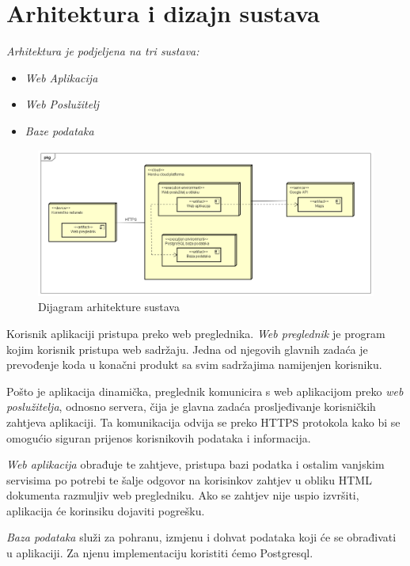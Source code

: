 \chapter{Arhitektura i dizajn sustava}

		\textit{Arhitektura je podjeljena na tri sustava:}
	\begin{itemize}
		\item 	\textit{Web Aplikacija}
		\item 	\textit{Web Poslužitelj}
		\item 	\textit{Baze podataka}		
	\end{itemize}
	
			\begin{figure}[H]
				\includegraphics[scale=0.4]{dijagrami/dijagram_razmjestaja.png} %
				\centering
				\caption{Dijagram arhitekture sustava}
				\label{fig:promjene}
			\end{figure}

		Korisnik aplikaciji pristupa preko web preglednika. \textit{Web preglednik} je program kojim korisnik pristupa web sadržaju. Jedna od njegovih glavnih zadaća je prevođenje koda u konačni produkt sa svim sadržajima namijenjen korisniku. 
		
		Pošto je aplikacija dinamička, preglednik komunicira s web aplikacijom preko \textit{web poslužitelja}, odnosno servera, čija je glavna zadaća prosljeđivanje korisničkih zahtjeva aplikaciji. Ta komunikacija odvija se preko HTTPS protokola kako bi se omogućio siguran prijenos korisnikovih podataka i informacija.
		
		\textit{Web aplikacija} obrađuje te zahtjeve, pristupa bazi podatka i ostalim vanjskim servisima po potrebi te šalje odgovor na korisinkov zahtjev u obliku HTML dokumenta razmuljiv web pregledniku. Ako se zahtjev nije uspio izvršiti, aplikacija će korinsiku dojaviti pogrešku. 
		
		\textit{Baza podataka} služi za pohranu, izmjenu i dohvat podataka koji će se obrađivati u aplikaciji. Za njenu implementaciju koristiti ćemo Postgresql.
	
